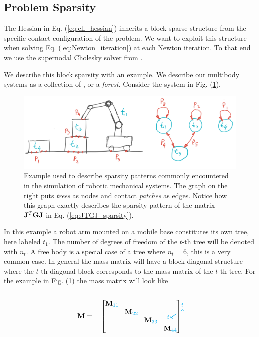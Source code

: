 \subsection{Problem Sparsity}

The Hessian in Eq. (\ref{eq:ell_hessian}) inherits a block sparse structure from
the specific contact configuration of the problem. We want to exploit this
structure when solving Eq. (\ref{eq:Newton_iteration}) at each Newton iteration.
To that end we use the supernodal Cholesky solver from \cite{bib:permenter2020}.

We describe this block sparsity with an example. We describe our
multibody systems as a collection of , or a
\textit{forest}. Consider the system in Fig.
(\ref{fig:sparsity_example}).
\begin{figure}[!h]
	\centering
	\includegraphics[width=0.7\columnwidth]{figures/sparsity_example.png}
	\caption{\label{fig:sparsity_example} 
	Example used to describe sparsity patterns commonly encountered in the
	simulation of robotic mechanical systems. The graph on the right puts
	\textit{trees} as nodes and contact \textit{patches} as edges. Notice how
	this graph exactly describes the sparsity pattern of the matrix
	${\mathbf{J}}^T{\mathbf{G}}{\mathbf{J}}$ in Eq. (\ref{eq:JTGJ_sparsity}).}
\end{figure}
In this example a robot arm mounted on a mobile base constitutes its own tree,
here labeled $t_1$. The number of degrees of freedom of the $t\text{-th}$ tree
will be denoted with $n_t$. A free body is a special case of a tree where
$n_t=6$, this is a very common case. In general the mass matrix will have a
block diagonal structure where the $t\text{-th}$ diagonal block corresponds to
the mass matrix of the $t\text{-th}$ tree. For the example in Fig.
(\ref{fig:sparsity_example}) the mass matrix will look like\\\\
\begin{equation}
	\mf{M}=\quad
	\begin{bmatrix}
		\tikzmark{M_topleft}
		\diagentry{\mf{M}_{\cc{11}}}&&&\tikzmark{M_topright}\\
		&\diagentry{\mf{M}_{\cc{22}}}\\
		&&\diagentry{\mf{M}_{\cc{33}}}\\		
		\tikzmark{M_bottomleft}&&&\diagentry{\mf{M}_{\cc{44}}}
	\end{bmatrix}
\tikz[overlay,remember picture] {
	\draw[->,thick,color=cyan]
  ([yshift=3ex]M_topleft) -- ([yshift=3ex]M_topright) node[midway,above]
  {\scriptsize $t$}; 
  \draw[->,thick,color=cyan]
  ([yshift=1.5ex,xshift=-2ex]M_topleft) -- ([xshift=-4ex]M_bottomleft)
  node[near end,left] {\scriptsize $t$};}	
\end{equation}

